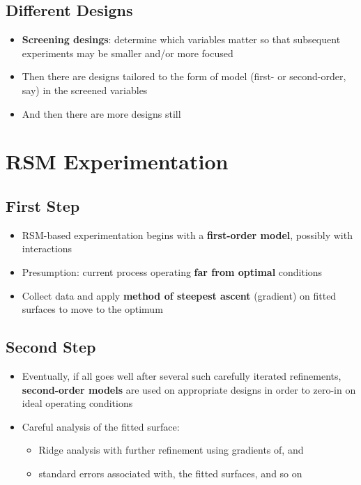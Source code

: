 \documentclass[
  letterpaper,
  DIV=11,
  numbers=noendperiod]{scrreprt}
\providecommand{\tightlist}{%
  \setlength{\itemsep}{0pt}\setlength{\parskip}{0pt}}\usepackage{longtable,booktabs,array}
\begin{document}
\hypertarget{different-designs}{%
\subsection{Different Designs}\label{different-designs}}

\begin{itemize}
\tightlist
\item
  \textbf{Screening desings}: determine which variables matter so that
  subsequent experiments may be smaller and/or more focused
\item
  Then there are designs tailored to the form of model (first- or
  second-order, say) in the screened variables
\item
  And then there are more designs still
\end{itemize}

\hypertarget{rsm-experimentation}{%
\section{RSM Experimentation}\label{rsm-experimentation}}

\hypertarget{first-step}{%
\subsection{First Step}\label{first-step}}

\begin{itemize}
\tightlist
\item
  RSM-based experimentation begins with a \textbf{first-order model},
  possibly with interactions
\item
  Presumption: current process operating \textbf{far from optimal}
  conditions
\item
  Collect data and apply \textbf{method of steepest ascent} (gradient)
  on fitted surfaces to move to the optimum
\end{itemize}

\hypertarget{second-step}{%
\subsection{Second Step}\label{second-step}}

\begin{itemize}
\tightlist
\item
  Eventually, if all goes well after several such carefully iterated
  refinements, \textbf{second-order models} are used on appropriate
  designs in order to zero-in on ideal operating conditions
\item
  Careful analysis of the fitted surface:

  \begin{itemize}
  \tightlist
  \item
    Ridge analysis with further refinement using gradients of, and
  \item
    standard errors associated with, the fitted surfaces, and so on
  \end{itemize}
\end{itemize}
\end{document}
